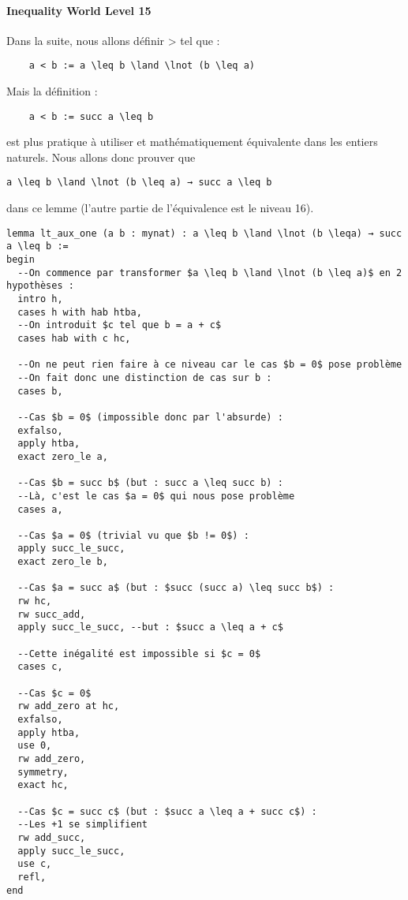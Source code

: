 \paragraph{Inequality World Level 15}

Dans la suite, nous allons définir > tel que :
\begin{verbatim}
    a < b := a \leq b \land \lnot (b \leq a)
\end{verbatim}
Mais la définition :
\begin{verbatim}
    a < b := succ a \leq b
\end{verbatim}
est plus pratique à utiliser et mathématiquement équivalente dans les entiers naturels.
Nous allons donc prouver  que 
\begin{verbatim}
a \leq b \land \lnot (b \leq a) → succ a \leq b
\end{verbatim}
dans ce lemme (l'autre partie de l'équivalence est le niveau 16).

\begin{verbatim}
lemma lt_aux_one (a b : mynat) : a \leq b \land \lnot (b \leqa) → succ a \leq b :=
begin
  --On commence par transformer $a \leq b \land \lnot (b \leq a)$ en 2 hypothèses :
  intro h,
  cases h with hab htba,
  --On introduit $c tel que b = a + c$
  cases hab with c hc,

  --On ne peut rien faire à ce niveau car le cas $b = 0$ pose problème
  --On fait donc une distinction de cas sur b :
  cases b,

  --Cas $b = 0$ (impossible donc par l'absurde) :
  exfalso,
  apply htba,
  exact zero_le a,

  --Cas $b = succ b$ (but : succ a \leq succ b) :
  --Là, c'est le cas $a = 0$ qui nous pose problème
  cases a,

  --Cas $a = 0$ (trivial vu que $b != 0$) :
  apply succ_le_succ,
  exact zero_le b,

  --Cas $a = succ a$ (but : $succ (succ a) \leq succ b$) :
  rw hc,
  rw succ_add,
  apply succ_le_succ, --but : $succ a \leq a + c$
  
  --Cette inégalité est impossible si $c = 0$
  cases c,

  --Cas $c = 0$
  rw add_zero at hc,
  exfalso,
  apply htba,
  use 0,
  rw add_zero,
  symmetry,
  exact hc,

  --Cas $c = succ c$ (but : $succ a \leq a + succ c$) :
  --Les +1 se simplifient
  rw add_succ,
  apply succ_le_succ,
  use c,
  refl,
end
\end{verbatim}
